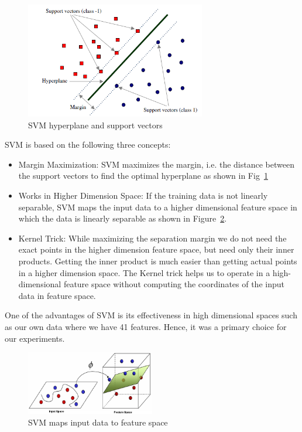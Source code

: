 \begin{figure}[htb]
	\centering
	\includegraphics[width=0.7\textwidth]{images/svm-hyperplane.png}
	\caption{SVM hyperplane and support vectors} 
	\label{fig:svm_hyperplane}
\end{figure}

SVM is based on the following three concepts:

\begin{itemize}
	\item Margin Maximization:
	SVM maximizes the margin, i.e. the distance between the support vectors to find the optimal hyperplane as shown in Fig~\ref{fig:svm_hyperplane}
	\item Works in Higher Dimension Space:
	If the training data is not linearly separable, SVM maps the input data to a higher dimensional feature space in which the data is linearly separable as shown in Figure~\ref{fig:svm_kernel}.
	\item Kernel Trick:
	While maximizing the separation margin we do not need the exact points in the higher dimension feature space, but need only their inner products. Getting the inner product is much easier than getting actual points in a higher dimension space. The Kernel trick helps us to operate in a high-dimensional feature space without computing the coordinates of the input data in feature space.
\end{itemize}

One of the advantages of SVM is its effectiveness in high dimensional spaces such as our own data where we have 41 features. Hence, it was a primary choice for our experiments.

\begin{figure}[htb]
	\centering
	\includegraphics[width=0.5\textwidth]{images/svm-kernel.png}
	\caption{SVM maps input data to feature space} 
	\label{fig:svm_kernel}
\end{figure}

